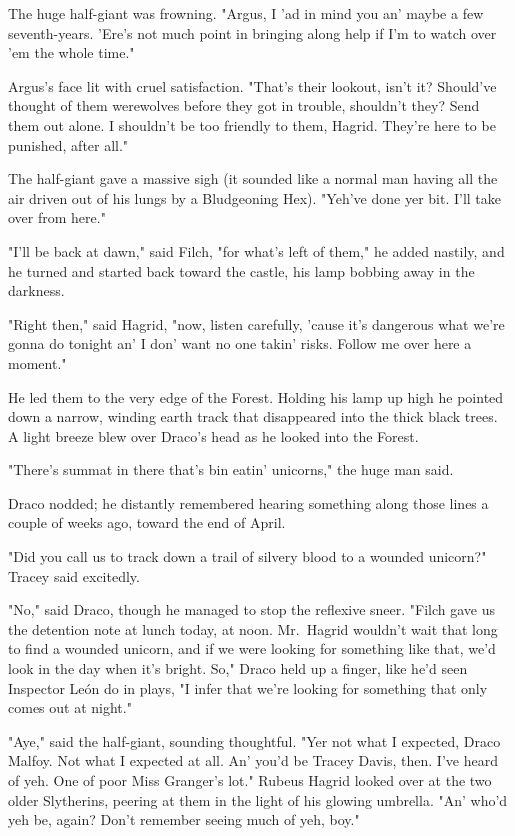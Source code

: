 The huge half-giant was frowning. "Argus, I 'ad in mind you an' maybe a few seventh-years. 'Ere's not much point in bringing along help if I'm to watch over 'em the whole time."

Argus's face lit with cruel satisfaction. "That's their lookout, isn't it? Should've thought of them werewolves before they got in trouble, shouldn't they? Send them out alone. I shouldn't be too friendly to them, Hagrid. They're here to be punished, after all."

The half-giant gave a massive sigh (it sounded like a normal man having all the air driven out of his lungs by a Bludgeoning Hex). "Yeh've done yer bit. I'll take over from here."

"I'll be back at dawn," said Filch, "for what's left of them," he added nastily, and he turned and started back toward the castle, his lamp bobbing away in the darkness.

"Right then," said Hagrid, "now, listen carefully, 'cause it's dangerous what we're gonna do tonight an' I don' want no one takin' risks. Follow me over here a moment."

He led them to the very edge of the Forest. Holding his lamp up high he pointed down a narrow, winding earth track that disappeared into the thick black trees. A light breeze blew over Draco's head as he looked into the Forest.

"There's summat in there that's bin eatin' unicorns," the huge man said.

Draco nodded; he distantly remembered hearing something along those lines a couple of weeks ago, toward the end of April.

"Did you call us to track down a trail of silvery blood to a wounded unicorn?" Tracey said excitedly.

"No," said Draco, though he managed to stop the reflexive sneer. "Filch gave us the detention note at lunch today, at noon. Mr.~Hagrid wouldn't wait that long to find a wounded unicorn, and if we were looking for something like that, we'd look in the day when it's bright. So," Draco held up a finger, like he'd seen Inspector León do in plays, "I infer that we're looking for something that only comes out at night."

"Aye," said the half-giant, sounding thoughtful. "Yer not what I expected, Draco Malfoy. Not what I expected at all. An' you'd be Tracey Davis, then. I've heard of yeh. One of poor Miss Granger's lot." Rubeus Hagrid looked over at the two older Slytherins, peering at them in the light of his glowing umbrella. "An' who'd yeh be, again? Don't remember seeing much of yeh, boy."

